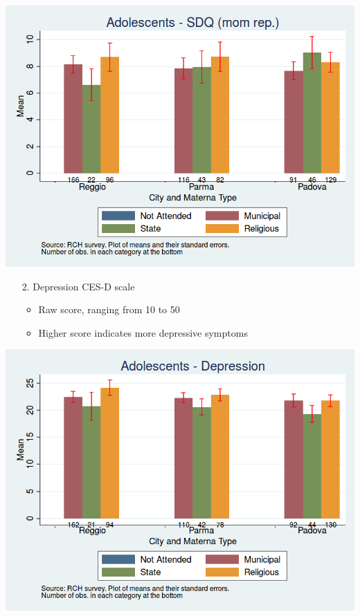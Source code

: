 \documentclass{beamer}
\begin{document}
\begin{frame}
\center
\includegraphics[scale=0.40]{../Output/childSDQ_score_Ado.png}
\end{frame}


\begin{frame}
\begin{itemize}
	\centering
	\item[2.] Depression CES-D scale
	\begin{itemize}
		\centering
		\item Raw score, ranging from 10 to 50
		\item Higher score indicates more depressive symptoms 
	\end{itemize}
\end{itemize}
\end{frame}

\begin{frame}
\center
\includegraphics[scale=0.40]{../Output/Depression_score_Ado.png}
\end{frame}
\end{document}
